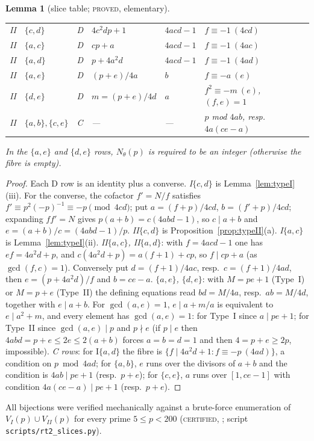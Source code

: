 \documentclass[10pt,reqno]{amsart}
\newtheorem{lemma}[theorem]{Lemma}
\theoremstyle{definition}
\numberwithin{equation}{section}
\newcommand{\status}[1]{\textup{\textsc{#1}}}
\begin{document}
\begin{lemma}[slice table; \status{proved}, elementary]
\begin{center}
\begin{tabular}{llllll}
II & $\{c,d\}$ & D & $4c^2dp+1$ & $4acd-1$ & $f\equiv-1\ (4cd)$\\
II & $\{a,c\}$ & D & $cp+a$ & $4acd-1$ & $f\equiv-1\ (4ac)$\\
II & $\{a,d\}$ & D & $p+4a^2d$ & $4acd-1$ & $f\equiv-1\ (4ad)$\\
II & $\{a,e\}$ & D & $(p+e)/4a$ & $b$ & $f\equiv-a\ (e)$\\
II & $\{d,e\}$ & D & $m=(p+e)/4d$ & $a$ & $f^2\equiv-m\ (e)$, $(f,e)=1$\\
II & $\{a,b\},\{c,e\}$ & C & --- & --- & $p$ mod $4ab$, resp.\ $4a(ce-a)$\\
\bottomrule
\end{tabular}
\end{center}
In the $\{a,e\}$ and $\{d,e\}$ rows, $N_\theta(p)$ is required to be an
integer (otherwise the fibre is empty).
\end{lemma}
\begin{proof}
Each D row is an identity plus a converse.
\emph{I$\{c,d\}$} is Lemma~\ref{lem:typeI}(iii). For the converse, the
cofactor $f'=N/f$ satisfies $f'\equiv p^2(-p)^{-1}\equiv-p\pmod{4cd}$; put
$a=(f+p)/4cd$, $b=(f'+p)/4cd$; expanding $ff'=N$ gives
$p(a+b)=c(4abd-1)$, so $c\mid a+b$ and $e=(a+b)/c=(4abd-1)/p$.
\emph{II$\{c,d\}$} is Proposition~\ref{prop:typeII}(a).
\emph{I$\{a,c\}$} is Lemma~\ref{lem:typeI}(ii).
\emph{II$\{a,c\}$, II$\{a,d\}$}: with $f=4acd-1$ one has $ef=4a^2d+p$, and
$c(4a^2d+p)=a(f+1)+cp$, so $f\mid cp+a$ (as $\gcd(f,c)=1$). Conversely put
$d=(f+1)/4ac$, resp.\ $c=(f+1)/4ad$, then $e=(p+4a^2d)/f$ and $b=ce-a$.
\emph{$\{a,e\}$, $\{d,e\}$}: with $M=pe+1$ (Type~I) or $M=p+e$ (Type~II)
the defining equations read $bd=M/4a$, resp.\ $ab=M/4d$, together with
$e\mid a+b$. For $\gcd(a,e)=1$, $e\mid a+m/a$ is equivalent to
$e\mid a^2+m$, and every element has $\gcd(a,e)=1$: for Type~I since
$a\mid pe+1$; for Type~II since $\gcd(a,e)\mid p$ and $p\nmid e$ (if
$p\mid e$ then $4abd=p+e\le2e\le2(a+b)$ forces $a=b=d=1$ and then
$4=p+e\ge2p$, impossible).
\emph{C rows}: for I$\{a,d\}$ the fibre is $\{f\mid4a^2d+1: f\equiv-p\ (4ad)\}$,
a condition on $p\bmod 4ad$; for $\{a,b\}$, $e$ runs over the divisors of
$a+b$ and the condition is $4ab\mid pe+1$ (resp.\ $p+e$); for $\{c,e\}$,
$a$ runs over $[1,ce-1]$ with condition $4a(ce-a)\mid pe+1$ (resp.\ $p+e$).
\end{proof}
All bijections were verified mechanically against a brute-force
enumeration of $V_I(p)\cup V_{II}(p)$ for every prime $5\le p<200$
(\status{certified}, \cite[Lemma~2.1]{RT2}; script
\texttt{scripts/rt2\_slices.py}).
\end{document}

